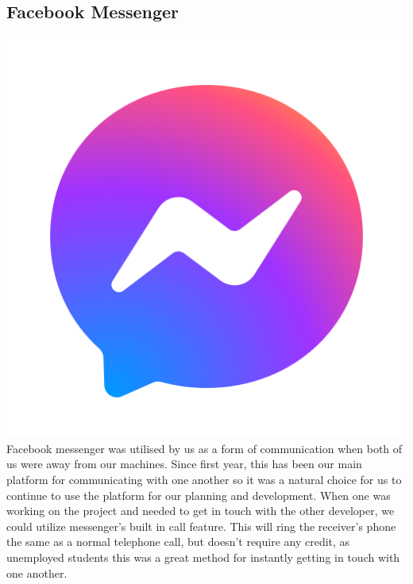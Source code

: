 \subsection{Facebook Messenger}
\includegraphics[scale=0.3]{img/messenger.png} \newline
Facebook messenger was utilised by us as a form of communication when both of us were away from our machines. Since first year, this has been our main platform for communicating with one another so it was a natural choice for us to continue to use the platform for our planning and development. When one was working on the project and needed to get in touch with the other developer, we could utilize messenger's built in call feature. This will ring the receiver's phone the same as a normal telephone call, but doesn't require any credit, as unemployed students this was a great method for instantly getting in touch with one another.

